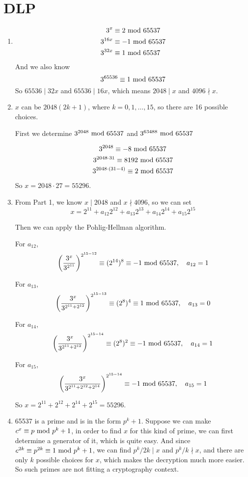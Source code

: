 \documentclass{article}
\renewcommand{\mod}{{\rm\ mod\ }}
\begin{document}
\section{DLP}
\begin{enumerate}
\item
\begin{align*}
3^x&\equiv2\mod 65537\\
3^{16x}&\equiv-1\mod 65537\\
3^{32x}&\equiv1\mod 65537\\
\end{align*}
And we also know $$3^{65536}\equiv1\mod 65537$$
So $65536\mid32x$ and $65536\mid16x$, which means $2048\mid x$ and $4096\nmid x$.

\item
$x$ can be $2048(2k+1)$, where $k=0,1,\dots,15$, so there are 16 possible choices.

First we determine $3^{2048}\mod 65537$ and $3^{63488}\mod 65537$\\

\begin{minipage}{0.4\linewidth}\end{minipage}
\begin{minipage}{0.4\linewidth}\end{minipage}

$$3^{2048}\equiv -8 \mod 65537$$
$$3^{2048\cdot31}\equiv 8192 \mod 65537$$
$$3^{2048\cdot(31-4)}\equiv 2 \mod 65537$$

So $x=2048\cdot27=55296$.

\item
From Part 1, we know $x\mid2048$ and $x\nmid4096$, so we can set $$x=2^{11}+a_{12}2^{12}+a_{13}2^{13}+a_{14}2^{14}+a_{15}2^{15}$$

Then we can apply the Pohlig-Hellman algorithm.

For $a_{12}$, $$\left(\dfrac{3^x}{3^{2^{11}}}\right)^{2^{15-12}}\equiv (2^{14})^8 \equiv -1\mod65537,\quad a_{12}=1$$

For $a_{13}$, $$\left(\dfrac{3^x}{3^{2^{11}+2^{12}}}\right)^{2^{15-13}}\equiv (2^{8})^4 \equiv 1\mod65537,\quad a_{13}=0$$

For $a_{14}$, $$\left(\dfrac{3^x}{3^{2^{11}+2^{12}}}\right)^{2^{15-14}}\equiv (2^{8})^2 \equiv -1\mod65537,\quad a_{14}=1$$

For $a_{15}$, $$\left(\dfrac{3^x}{3^{2^{11}+2^{12}+2^{14}}}\right)^{2^{15-14}}\equiv -1\mod65537,\quad a_{15}=1$$

So $x=2^{11}+2^{12}+2^{14}+2^{15}=55296$.

\item
65537 is a prime and is in the form $p^k+1$. Suppose we can make $c^x\equiv p\mod p^k+1$, in order to find $x$ for this kind of prime, we can first determine a generator of it, which is quite easy. And since $c^{2k}\equiv p^{2k}\equiv 1\mod p^k+1$, we can find $p^k/2k\mid x$ and $p^k/k\nmid x$, and there are only $k$ possible choices for $x$, which makes the decryption much more easier. So such primes are not fitting a cryptography context.

\end{enumerate}
\end{document}
